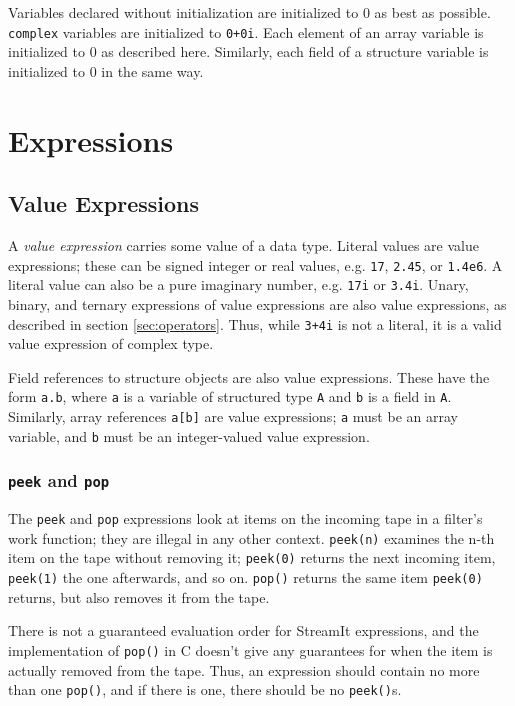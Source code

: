 \documentclass[11pt]{article}
\begin{document}
Variables declared without initialization are initialized to 0 as best
as possible.  \lstinline|complex| variables are initialized to
\lstinline|0+0i|.  Each element of an array variable is initialized to
0 as described here.  Similarly, each field of a structure variable is
initialized to 0 in the same way.


\section{Expressions}

\subsection{Value Expressions}
\label{sec:expr-value}

A \emph{value expression} carries some value of a data type.  Literal
values are value expressions; these can be signed integer or real
values, e.g. \lstinline|17|, \lstinline|2.45|, or \lstinline|1.4e6|.  A literal value
can also be a pure imaginary number, e.g. \lstinline|17i| or \lstinline|3.4i|.
Unary, binary, and ternary expressions of value expressions are also
value expressions, as described in section \ref{sec:operators}.  Thus,
while \lstinline|3+4i| is not a literal, it is a valid value expression of
complex type.

Field references to structure objects are also value expressions.
These have the form \lstinline|a.b|, where \lstinline|a| is a variable of
structured type \lstinline|A| and \lstinline|b| is a field in \lstinline|A|.
Similarly, array references \lstinline|a[b]| are value expressions;
\lstinline|a| must be an array variable, and \lstinline|b| must be an
integer-valued value expression.

\subsubsection{\lstinline|peek| and \lstinline|pop|}
\label{sec:expr-peek-pop}

The \lstinline|peek| and \lstinline|pop| expressions look at items on
the incoming tape in a filter's work function; they are illegal in any
other context.  \lstinline|peek(n)| examines the n-th item on the tape
without removing it; \lstinline|peek(0)| returns the next incoming
item, \lstinline|peek(1)| the one afterwards, and so on.
\lstinline|pop()| returns the same item \lstinline|peek(0)| returns,
but also removes it from the tape.

\begin{note}
There is not a guaranteed evaluation order for StreamIt expressions,
and the implementation of \lstinline|pop()| in C doesn't give any
guarantees for when the item is actually removed from the tape.  Thus,
an expression should contain no more than one \lstinline|pop()|, and
if there is one, there should be no \lstinline|peek()|s.
\end{note}
\end{document}
